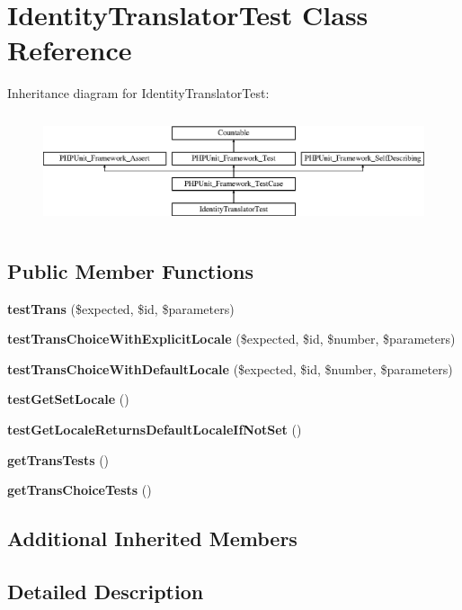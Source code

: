 \section{Identity\+Translator\+Test Class Reference}
\label{class_symfony_1_1_component_1_1_translation_1_1_tests_1_1_identity_translator_test}
Inheritance diagram for Identity\+Translator\+Test\+:\begin{figure}[H]
\begin{center}
\leavevmode
\includegraphics[height=3.303835cm]{class_symfony_1_1_component_1_1_translation_1_1_tests_1_1_identity_translator_test}
\end{center}
\end{figure}
\subsection*{Public Member Functions}
\begin{DoxyCompactItemize}
\item 
{\bf test\+Trans} (\$expected, \$id, \$parameters)
\item 
{\bf test\+Trans\+Choice\+With\+Explicit\+Locale} (\$expected, \$id, \$number, \$parameters)
\item 
{\bf test\+Trans\+Choice\+With\+Default\+Locale} (\$expected, \$id, \$number, \$parameters)
\item 
{\bf test\+Get\+Set\+Locale} ()
\item 
{\bf test\+Get\+Locale\+Returns\+Default\+Locale\+If\+Not\+Set} ()
\item 
{\bf get\+Trans\+Tests} ()
\item 
{\bf get\+Trans\+Choice\+Tests} ()
\end{DoxyCompactItemize}
\subsection*{Additional Inherited Members}


\subsection{Detailed Description}


